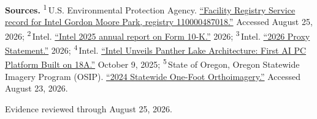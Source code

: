 \begin{minipage}[t][0.90\textheight][t]{\textwidth}
{\sffamily\scriptsize\setlength{\emergencystretch}{1.5em}\textbf{Sources.} \textsuperscript{1}\,U.S. Environmental Protection Agency. \href{\detokenize{https://frs-public.epa.gov/ords/frs_public2/fii_query_dtl.disp_program_facility?p_registry_id=110000487018}}{\enquote{Facility Registry Service record for Intel Gordon Moore Park, registry 110000487018.}} Accessed August 25, 2026; \textsuperscript{2}\,Intel. \href{\detokenize{https://www.intc.com/filings-reports/all-sec-filings/content/0000050863-26-000011/intc-20251227.htm}}{\enquote{Intel 2025 annual report on Form 10-K.}} 2026; \textsuperscript{3}\,Intel. \href{\detokenize{https://www.intc.com/filings-reports/all-sec-filings/content/0000050863-26-000061/proxy2026.htm}}{\enquote{2026 Proxy Statement.}} 2026; \textsuperscript{4}\,Intel. \href{\detokenize{https://web.archive.org/web/20260730143304/https://newsroom.intel.com/client-computing/intel-unveils-panther-lake-architecture-first-ai-pc-platform-built-on-18a}}{\enquote{Intel Unveils Panther Lake Architecture: First AI PC Platform Built on 18A.}} October 9, 2025; \textsuperscript{5}\,State of Oregon, Oregon Statewide Imagery Program (OSIP). \href{\detokenize{https://imagery.oregonexplorer.info/arcgis/rest/services/OSIP_2024/OSIP_2024_WM/ImageServer}}{\enquote{2024 Statewide One-Foot Orthoimagery.}} Accessed August 23, 2026.\par}
\vfill
\noindent{\color{hairline}\rule{\linewidth}{0.4pt}}\par\smallskip
{\sffamily\scriptsize\color{black!58} Evidence reviewed through August 25, 2026.\par}
\end{minipage}
\clearpage
